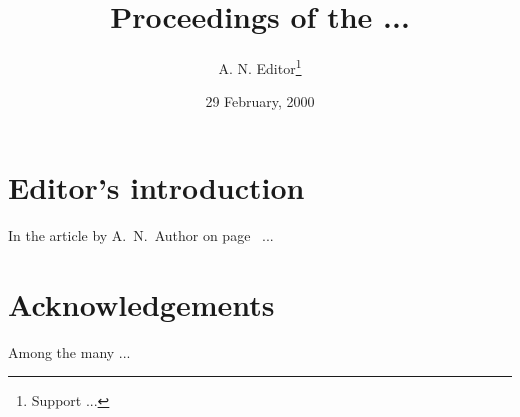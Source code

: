 \documentclass[11pt]{combine}
\title{Proceedings of the ...}
\author{A. N. Editor\thanks{Support ...}}
\date{29 February, 2000}
\begin{document}
\pagestyle{combine}        %
\maketitle                 %
\tableofcontents           %
\clearpage
\section{Editor's introduction} \label{intro}  %
In the article by A.~N.~Author on page~\pageref{art1} ...
\begin{papers}                  %
\label{art1}
%
\end{papers}                    %
\clearpage
\section{Acknowledgements}      %
Among the many ...
\end{document}
